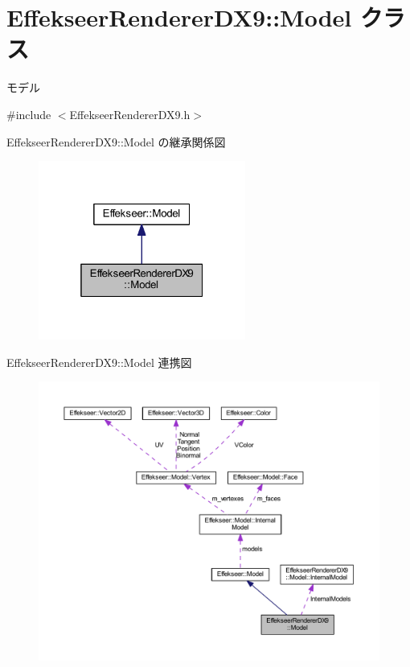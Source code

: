 \hypertarget{class_effekseer_renderer_d_x9_1_1_model}{}\section{Effekseer\+Renderer\+D\+X9\+:\+:Model クラス}
\label{class_effekseer_renderer_d_x9_1_1_model}


モデル  




{\ttfamily \#include $<$Effekseer\+Renderer\+D\+X9.\+h$>$}



Effekseer\+Renderer\+D\+X9\+:\+:Model の継承関係図\nopagebreak
\begin{figure}[H]
\begin{center}
\leavevmode
\includegraphics[width=193pt]{class_effekseer_renderer_d_x9_1_1_model__inherit__graph}
\end{center}
\end{figure}


Effekseer\+Renderer\+D\+X9\+:\+:Model 連携図\nopagebreak
\begin{figure}[H]
\begin{center}
\leavevmode
\includegraphics[width=350pt]{class_effekseer_renderer_d_x9_1_1_model__coll__graph}
\end{center}
\end{figure}
